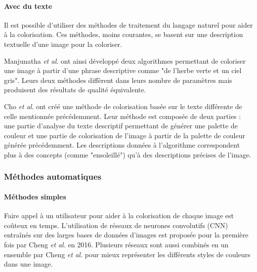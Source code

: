 \documentclass{article}
\begin{document}
\paragraph{Avec du texte}
Il est possible d'utiliser des méthodes de traitement du langage naturel pour aider à la colorisation.
Ces méthodes, moins courantes, se basent sur une description textuelle d'une image pour la coloriser. 

Manjunatha \emph{et al}. \cite{journals/corr/abs-1804-06026} ont ainsi développé deux algorithmes permettant de coloriser une image à partir d'une phrase descriptive comme "de l'herbe verte et un ciel gris".
Leurs deux méthodes diffèrent dans leurs nombre de paramètres mais produisent des résultats de qualité équivalente.

Cho \emph{et al}. \cite{journals/corr/abs-1804-04128} ont créé une méthode de colorisation basée sur le texte différente de celle mentionnée précédemment.
Leur méthode est composée de deux parties : une partie d'analyse du texte descriptif permettant de générer une palette de couleur et une partie de colorisation
de l'image à partir de la palette de couleur générée précédemment. Les descriptions données à l'algorithme correspondent plus à des concepts (comme "ensoleillé")
qu'à des descriptions précises de l'image.



\subsubsection{Méthodes automatiques}

\paragraph{Méthodes simples}
Faire appel à un utilisateur pour aider à la colorisation de chaque image est coûteux en temps.
L'utilisation de réseaux de neurones convolutifs (CNN) entraînés sur des larges bases de données d'images est proposée pour la première fois par Cheng \emph{et al.} \cite{journals/corr/ChengYS16} en 2016.
Plusieurs réseaux sont aussi combinés en un ensemble par Cheng \emph{et al.} \cite{8011494} pour mieux représenter les différents styles de couleurs dans une image.
\end{document}
